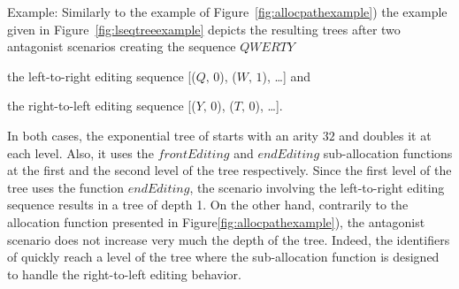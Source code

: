 \begin{asparadesc}
\item[Example:] Similarly to the example of Figure~\ref{fig:allocpathexample})
   the example given in Figure~\ref{fig:lseqtreeexample} depicts the resulting
   trees after two antagonist scenarios creating the sequence
   $QWERTY$ \begin{inparaenum}[(i)] \item the left-to-right editing sequence
     [($Q,\,0$), ($W,\,1$), \ldots] and \item the right-to-left editing sequence
     [($Y,\,0$), ($T,\,0$), \ldots]. \end{inparaenum} In both cases, the
   exponential tree of \LSEQ starts with an arity $32$ and doubles it at each
   level. Also, it uses the $frontEditing$ and $endEditing$ sub-allocation
   functions at the first and the second level of the tree respectively. Since
   the first level of the tree uses the function $endEditing$, the scenario
   involving the left-to-right editing sequence results in a tree of depth 1. On
   the other hand, contrarily to the allocation function presented in
   Figure\ref{fig:allocpathexample}), the antagonist scenario does not increase
   very much the depth of the tree. Indeed, the identifiers of \LSEQ quickly
   reach a level of the tree where the sub-allocation function is designed to
   handle the right-to-left editing behavior.
\end{asparadesc}


